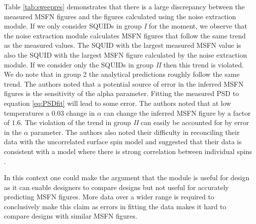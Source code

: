 Table \ref{tab:sweepres} demonstrates that there is a large discrepancy between the measured MSFN figures and the figures calculated using the noise extraction module. If we only consider SQUIDs in group \textit{I} for the moment, we observe that the noise extraction module calculates MSFN figures that follow the same trend as the measured values. The SQUID with the largest measured MSFN value is also the SQUID with the largest MSFN figure calculated by the noise extraction module. If we consider only the SQUIDs in group \textit{II} then this trend is violated. We do note that in group 2 the analytical predictions roughly follow the same trend. The authors noted that a potential source of error in the inferred MSFN figures is the sensitivity of the alpha parameter. Fitting the measured PSD to equation \ref{eq:PSDfit} will lead to some error. The authors noted that at low temperatures a $0.03$ change in $\alpha$ can change the inferred MSFN figure by a factor of $1.6$. The violation of the trend in group \textit{II} can easily be accounted for by error in the $\alpha$ parameter. The authors also noted their difficulty in reconciling their data with the uncorrelated surface spin model and suggested that their data is consistent with a model where there is strong correlation between individual spins \cite{fluxNoiseSquidsStevenAnton}. \par
In this context one could make the argument that the module is useful for design as it can enable designers to compare designs but not useful for accurately predicting MSFN figures. More data over a wider range is required to conclusively make this claim as errors in fitting the data makes it hard to compare designs with similar MSFN figures.